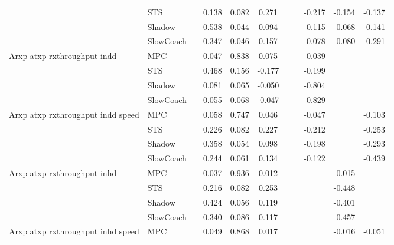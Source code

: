 \begin{tabular}{|l|l|*{9}{c|}}
                              & STS &       &     0.138 &     0.082 &  0.271 &     &     &  -0.217 &  -0.154 &   -0.137 \\
                              & Shadow &       &     0.538 &     0.044 &  0.094 &     &     &  -0.115 &  -0.068 &   -0.141 \\
                              & SlowCoach &       &     0.347 &     0.046 &  0.157 &     &     &  -0.078 &  -0.080 &   -0.291 \\
\midrule
Arxp atxp rxthroughput indd    & MPC &       &     0.047 &     0.838 &  0.075 &     &     &  -0.039 &      &       \\
                              & STS &       &     0.468 &     0.156 & -0.177 &     &     &  -0.199 &      &       \\
                              & Shadow &       &     0.081 &     0.065 & -0.050 &     &     &  -0.804 &      &       \\
                              & SlowCoach &       &     0.055 &     0.068 & -0.047 &     &     &  -0.829 &      &       \\
\midrule
Arxp atxp rxthroughput indd speed    & MPC &       &     0.058 &     0.747 &  0.046 &     &     &  -0.047 &      &   -0.103 \\
                              & STS &       &     0.226 &     0.082 &  0.227 &     &     &  -0.212 &      &   -0.253 \\
                              & Shadow &       &     0.358 &     0.054 &  0.098 &     &     &  -0.198 &      &   -0.293 \\
                              & SlowCoach &       &     0.244 &     0.061 &  0.134 &     &     &  -0.122 &      &   -0.439 \\
\midrule
Arxp atxp rxthroughput inhd    & MPC &       &     0.037 &     0.936 &  0.012 &     &     &      &  -0.015 &       \\
                              & STS &       &     0.216 &     0.082 &  0.253 &     &     &      &  -0.448 &       \\
                              & Shadow &       &     0.424 &     0.056 &  0.119 &     &     &      &  -0.401 &       \\
                              & SlowCoach &       &     0.340 &     0.086 &  0.117 &     &     &      &  -0.457 &       \\
\midrule
Arxp atxp rxthroughput inhd speed    & MPC &       &     0.049 &     0.868 &  0.017 &     &     &      &  -0.016 &   -0.051 \\

\end{tabular}
